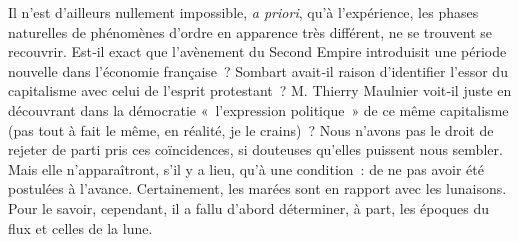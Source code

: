 \documentclass[french,twoside]{book} %
\newcommand{\astermono}{\medskip\centerline{\color{rubric}\large\selectfont{\syms ✻}}\medskip\par}%
\begin{document}
Il n’est d’ailleurs nullement impossible, \emph{a priori}, qu’à l’expérience, les phases naturelles de phénomènes d’ordre en apparence très différent, ne se trouvent se recouvrir. Est‑il exact que l’avènement du Second Empire introduisit une période nouvelle dans l’économie française ? Sombart avait‑il raison d’identifier l’essor du capitalisme avec celui de l’esprit protestant ? M. Thierry Maulnier voit‑il juste en découvrant dans la démocratie « l’expression politique » de ce même capitalisme (pas tout à fait le même, en réalité, je le crains) ? Nous n’avons pas le droit de rejeter de parti pris ces coïncidences, si douteuses qu’elles puissent nous sembler. Mais elle n’apparaîtront, s’il y a lieu, qu’à une condi­tion : de ne pas avoir été postulées à l’avance. Certainement, les marées sont en rapport avec les lunaisons. Pour le savoir, cependant, il a fallu d’abord déterminer, à part, les époques du flux et celles de la lune.\par

\astermono
\end{document}
